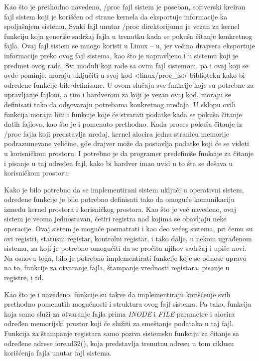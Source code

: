 \documentclass[a4paper, 12pt, diplomski]{etf}
\begin{document}
	Kao što je prethodno navedeno, /proc fajl sistem je poseban, softverski kreiran fajl sistem koji je korišćen od strane kernela da eksportuje informacije ka spoljašnjem sistemu. Svaki fajl unutar /proc direktorijuma je vezan za kernel funkciju koja generiše sadržaj fajla u trenutku kada se pokuša čitanje konkretnog fajla. Ovaj fajl sistem se mnogo koristi u Linux – u, jer većina drajvera eksportuje informacije preko ovog fajl sistema, kao što je napravljeno i u sistemu koji je predmet ovog rada. Svi moduli koji rade sa ovim fajl sistemom, pa i ovaj koji se ovde pominje, moraju uključiti u svoj kod <linux/proc\_fs> biblioteku kako bi određene funkcije bile definisane. U ovom slučaju sve funkcije koje su potrebne za upravljanje fajlom, a tim i hardverom za koji je vezan ovaj kod, moraju se definisati tako da odgovaraju potrebama konkretnog uređaja. U sklopu ovih funkcija moraju biti i funkcije koje će stvarati podatke kada se pokuša čitanje datih fajlova, kao što je i pomenuto prethodno. Kada proces pokuša čitanje iz /proc fajla koji predstavlja uređaj, kernel alocira jednu stranicu memorije podrazumevane veličine, gde drajver može da postavlja podatke koji će se videti u korisničkom prostoru. I potrebno je da programer predefiniše funkcije za čitanje i pisanje u taj određen fajl, kako bi hardver imao uvid u to šta se dešava u korisničkom prostoru.

	Kako je bilo potrebno da se implementirani sistem uključi u operativni sistem, određene funkcije je bilo potrebno definisati tako da omoguće komunikaciju između kernel prostora i korisničkog prostora. Kao što je već navedeno, ovaj sistem je veoma jednostavan, četiri registra nad kojima se obavljaju neke operacije. Ovaj sistem je moguće posmatrati i kao deo većeg sistema, pri čemu su ovi registri, statusni registar, kontrolni registar, i tako dalje, u nekom ugrađenom sistemu, za koji je potrebno omogućiti da se pročita njihov sadržaj i upiše novi. Na osnovu toga, bilo je potrebno implementirati funkcije koje se odnose upravo na to, funkcije za otvaranje fajla, štampanje vrednosti registara, pisanje u registre, i td.

	Kao što je i navedeno, funkcije su takve da implementiraju korišćenje svih prethodno pomenutih mogućnosti i struktura ovog fajl sistema. Pa tako, funkcija koja samo služi za otvaranje fajla prima \textit{INODE} i \textit{FILE} parametre i alocira određen memorijski prostor koji će služiti za smeštanje podataka u taj fajl. Funkcija za štampanje registara samo poziva sistemsku funkciju za čitanje sa određene adrese ioread32(), koja predstavlja trenutnu adresu u tom ciklusu korišćenja fajla unutar fajl sistema.
\end{document}
